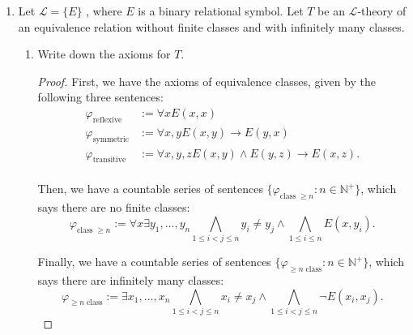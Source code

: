 \documentclass{article}
\begin{document}
\begin{enumerate}[label={\bf Q\arabic*:}]
\begin{proof}
      $\wedge$: We have $\mathcal{M}\models\varphi([c_1],\ldots,[c_n])
      \wedge \phi([d_1],\ldots,[d_m])$
      \begin{align*}
          &\leftrightarrow \mathcal{M}\models\varphi([c_1],\ldots,[c_n])\;
          \text{and}\; \mathcal{M}\models\phi([d_1],\ldots,[d_m]) & \\
          &\leftrightarrow R(c_1,\ldots,c_n)\in T\; \text{and}\;
            R(d_1,\ldots,d_m)\in T & (\text{by inductive hypothesis}) \\
          &\leftrightarrow R(c_1,\ldots,c_n)\wedge R(d_1,\ldots,d_m)\in T &
            (\text{by Completeness of}\; T). \\
      \end{align*}
    \end{proof}

  \item Let $\mathcal{L}=\{E\}$ , where $E$ is a binary relational symbol.
    Let $T$ be an $\mathcal{L}$-theory of an equivalence relation without
    finite classes and with infinitely many classes.

    \begin{enumerate}
      \item Write down the axioms for $T$.
        \begin{proof}
          First, we have the axioms of equivalence classes, given by the
          following three sentences:
          \begin{align*}
            \varphi_{\text{reflexive}}  &:= \forall x E(x,x) \\
            \varphi_{\text{symmetric}}  &:= \forall x,y E(x,y)\rightarrow
              E(y,x) \\
            \varphi_{\text{transitive}} &:= \forall x,y,z E(x,y)\wedge
              E(y,z)\rightarrow E(x,z). \\
          \end{align*}

          Then, we have a countable series of sentences
          $\{\varphi_{\text{class}\;\geq n}:n\in\mathbb{N}^+\}$, which says
          there are no finite classes:
          \begin{equation*}
            \varphi_{\text{class}\;\geq n} := \forall x\exists y_1,\ldots,y_n
            \bigwedge_{1\leq i<j\leq n} y_i\neq y_j \wedge
            \bigwedge_{1\leq i\leq n} E(x,y_i).
          \end{equation*}

          Finally, we have a countable series of sentences
          $\{\varphi_{\geq n\;\text{class}}:n\in\mathbb{N}^+\}$, which says
          there are infinitely many classes:
          \begin{equation*}
            \varphi_{\geq n\;\text{class}} := \exists x_1,\ldots,x_n
            \bigwedge_{1\leq i<j\leq n} x_i\neq x_j \wedge
            \bigwedge_{1\leq i<j\leq n} \neg E(x_i,x_j).
          \end{equation*}
        \end{proof}


\end{enumerate}
\end{enumerate}
\end{document}
